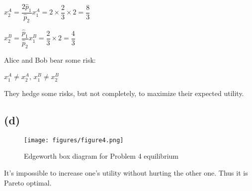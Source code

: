 \documentclass{article}
\begin{document}
$x^{A}_{2}=\dfrac{2\hat{p}_{1}}{\hat{p}_{2}}x^{A}_{1}=2\times\dfrac{2}{3}\times2=\dfrac{8}{3}$

$x^{B}_{2}=\dfrac{\hat{p}_{1}}{\hat{p}_{2}}x^{B}_{1}=\dfrac{2}{3}\times2=\dfrac{4}{3}$

Alice and Bob bear some risk: 

$x^{A}_{1}\neq x^{A}_{2}$, $x^{B}_{1}\neq x^{B}_{2}$

They hedge some risks, but not completely, to maximize their expected utility.

\subsection*{(d)}

\begin{figure}[H]
    \begin{center}
        \texttt{[image: figures/figure4.png]}
    \end{center}
    \caption{Edgeworth box diagram for Problem 4 equilibrium}
    \label{fig:graph}
\end{figure}

It's impossible to increase one's utility without hurting the other one. Thus it is Pareto optimal.
\end{document}
